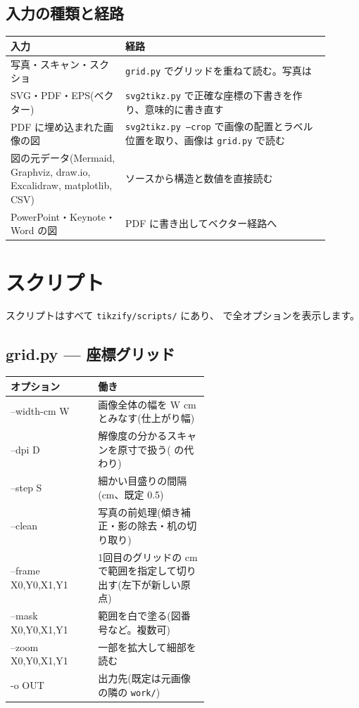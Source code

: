 \documentclass[a4paper,11pt]{ltjsarticle}
\newcommand{\cmd}[1]{\texttt{#1}}
\newcommand{\opt}[1]{\texttt{\detokenize{#1}}}
\begin{document}
\subsection{入力の種類と経路}
\begin{center}
\begin{tabular}{p{0.32\linewidth} p{0.58\linewidth}}
\toprule
入力 & 経路 \\
\midrule
写真・スキャン・スクショ & \cmd{grid.py} でグリッドを重ねて読む。写真は \opt{--clean} \\
SVG・PDF・EPS(ベクター) & \cmd{svg2tikz.py} で正確な座標の下書きを作り、意味的に書き直す \\
PDF に埋め込まれた画像の図 & \cmd{svg2tikz.py --crop} で画像の配置とラベル位置を取り、画像は \cmd{grid.py} で読む \\
図の元データ(Mermaid, Graphviz, draw.io, Excalidraw, matplotlib, CSV) & ソースから構造と数値を直接読む \\
PowerPoint・Keynote・Word の図 & PDF に書き出してベクター経路へ \\
\bottomrule
\end{tabular}
\end{center}

\section{スクリプト}
スクリプトはすべて \cmd{tikzify/scripts/} にあり、\opt{-h} で全オプションを表示します。

\subsection{grid.py --- 座標グリッド}
\begin{tabular}{>{\ttfamily}l p{0.56\linewidth}}
\toprule
\normalfont オプション & 働き \\ \midrule
--width-cm W & 画像全体の幅を W cm とみなす(仕上がり幅) \\
--dpi D & 解像度の分かるスキャンを原寸で扱う(\opt{--width-cm} の代わり) \\
--step S & 細かい目盛りの間隔(cm、既定 0.5) \\
--clean & 写真の前処理(傾き補正・影の除去・机の切り取り) \\
--frame X0,Y0,X1,Y1 & 1回目のグリッドの cm で範囲を指定して切り出す(左下が新しい原点) \\
--mask X0,Y0,X1,Y1 & 範囲を白で塗る(図番号など。複数可) \\
--zoom X0,Y0,X1,Y1 & 一部を拡大して細部を読む \\
-o OUT & 出力先(既定は元画像の隣の \texttt{work/}) \\
\bottomrule
\end{tabular}
\end{document}
